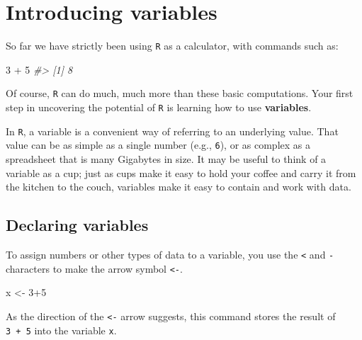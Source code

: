 \documentclass[
]{book}
\newenvironment{Shaded}{\begin{snugshade}}{\end{snugshade}}
\newcommand{\CommentTok}[1]{\textcolor[rgb]{0.56,0.35,0.01}{\textit{#1}}}
\newcommand{\DecValTok}[1]{\textcolor[rgb]{0.00,0.00,0.81}{#1}}
\newcommand{\NormalTok}[1]{#1}
\newcommand{\OtherTok}[1]{\textcolor[rgb]{0.56,0.35,0.01}{#1}}
\newcommand{\SpecialCharTok}[1]{\textcolor[rgb]{0.00,0.00,0.00}{#1}}
\begin{document}
\hypertarget{introducing-variables}{%
\section*{Introducing variables}\label{introducing-variables}}

So far we have strictly been using \texttt{R} as a calculator, with commands such as:

\begin{Shaded}
\begin{Highlighting}[]
\DecValTok{3} \SpecialCharTok{+} \DecValTok{5}
\CommentTok{\#\textgreater{} [1] 8}
\end{Highlighting}
\end{Shaded}

Of course, \texttt{R} can do much, much more than these basic computations. Your first step in uncovering the potential of \texttt{R} is learning how to use \textbf{variables}.

In \texttt{R}, a variable is a convenient way of referring to an underlying value. That value can be as simple as a single number (e.g., \texttt{6}), or as complex as a spreadsheet that is many Gigabytes in size. It may be useful to think of a variable as a cup; just as cups make it easy to hold your coffee and carry it from the kitchen to the couch, variables make it easy to contain and work with data.

\hypertarget{declaring-variables}{%
\subsection*{Declaring variables}\label{declaring-variables}}

To assign numbers or other types of data to a variable, you use the \texttt{\textless{}} and \texttt{-} characters to make the arrow symbol \texttt{\textless{}-}.

\begin{Shaded}
\begin{Highlighting}[]
\NormalTok{x }\OtherTok{\textless{}{-}} \DecValTok{3}\SpecialCharTok{+}\DecValTok{5}
\end{Highlighting}
\end{Shaded}

As the direction of the \texttt{\textless{}-} arrow suggests, this command stores the result of \texttt{3\ +\ 5} into the variable \texttt{x}.
\end{document}

